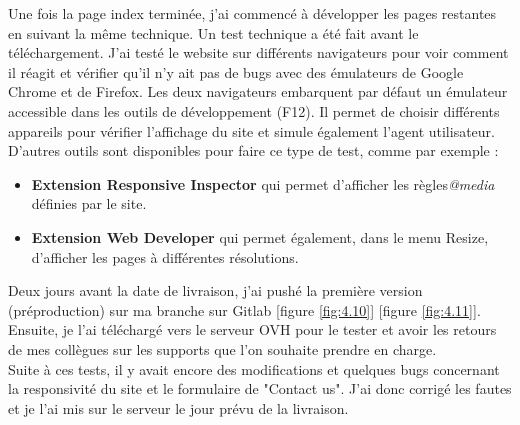 \documentclass[a4paper, 12pt]{report}
\begin{document}
Une fois la page index terminée, j’ai commencé à développer les pages restantes en suivant la même technique.
Un test technique a été fait avant le téléchargement. J’ai testé le website sur différents navigateurs pour voir comment il réagit et vérifier qu’il n’y ait pas de bugs avec des émulateurs de Google Chrome et de Firefox. Les deux navigateurs embarquent par défaut un émulateur accessible dans les outils de développement (F12). Il permet de choisir différents appareils pour vérifier l'affichage du site et simule également l'agent utilisateur.\\
D’autres outils sont disponibles pour faire ce type de test, comme par exemple :
\begin{itemize}
\item \textbf{Extension Responsive Inspector} qui permet d'afficher les règles\textit{@media}  définies par le site.
\item \textbf{Extension Web Developer} qui permet également, dans le menu Resize, d'afficher les pages à différentes résolutions.\\
\end{itemize} 
Deux jours avant la date de livraison, j’ai pushé la première version (préproduction) sur ma branche sur Gitlab [figure \ref{fig:4.10}] [figure \ref{fig:4.11}]. Ensuite, je l’ai téléchargé vers le serveur OVH pour le tester et avoir les retours de mes collègues sur les supports que l'on souhaite prendre en charge.\\

Suite à ces tests, il y avait encore des modifications et quelques bugs concernant la responsivité du site et le formulaire de "Contact us". J’ai donc corrigé les fautes et je l’ai mis sur le serveur le jour prévu de la livraison.
\end{document}
